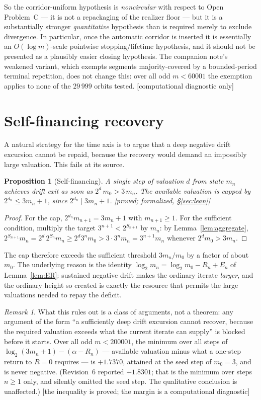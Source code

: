 \documentclass[11pt]{article}
\theoremstyle{plain}
\newtheorem{proposition}[theorem]{Proposition}
\theoremstyle{definition}
\theoremstyle{remark}
\newtheorem{remark}[theorem]{Remark}
\newcommand{\al}{\alpha}
\newcommand{\status}[1]{\textsf{\footnotesize[#1]}}
\begin{document}
So the corridor-uniform hypothesis is \emph{noncircular} with respect to Open Problem~C --- it is
not a repackaging of the realizer floor --- but it is a substantially stronger \emph{quantitative}
hypothesis than is required merely to exclude divergence. In particular, once the automatic
corridor is inserted it is essentially an $O(\log m)$-scale pointwise stopping/lifetime hypothesis,
and it should not be presented as a plausibly easier closing hypothesis. The
companion note's weakened variant, which exempts segments majority-covered by a bounded-period
terminal repetition, does not change this: over all odd $m<60001$ the exemption applies to none of
the $29\,999$ orbits tested. \status{computational diagnostic only}

\section{Self-financing recovery}\label{sec:selffin}

A natural strategy for the time axis is to argue that a deep negative drift excursion cannot be
repaid, because the recovery would demand an impossibly large valuation. This fails at its source.

\begin{proposition}[Self-financing]\label{prop:selffin}
A single step of valuation $d$ from state $m_n$ achieves drift exit as soon as
$2^{d}\,m_0>3\,m_n$. The available valuation is capped by $2^{d_n}\le 3m_n+1$, since
$2^{d_n}\mid 3m_n+1$. \status{proved; formalized, \S\ref{sec:lean}}
\end{proposition}

\begin{proof}
For the cap, $2^{d_n}m_{n+1}=3m_n+1$ with $m_{n+1}\ge1$. For the sufficient condition, multiply the
target $3^{n+1}<2^{S_{n+1}}$ by $m_n$: by Lemma~\ref{lem:aggregate},
$2^{S_{n+1}}m_n=2^{d}\,2^{S_n}m_n\ge 2^{d}3^nm_0>3\cdot3^nm_n=3^{n+1}m_n$ whenever
$2^dm_0>3m_n$.
\end{proof}

The cap therefore exceeds the sufficient threshold $3m_n/m_0$ by a factor of about $m_0$. The
underlying reason is the identity $\log_2 m_n=\log_2 m_0-R_n+E_n$ of Lemma~\ref{lem:ER}: sustained
negative drift makes the ordinary iterate \emph{larger}, and the ordinary height so created is
exactly the resource that permits the large valuations needed to repay the deficit.

\begin{remark}\label{rem:selffin}
What this rules out is a class of arguments, not a theorem: any argument of the form ``a
sufficiently deep drift excursion cannot recover, because the required valuation exceeds what the
current iterate can supply'' is blocked before it starts. Over all odd $m<200001$, the minimum over
all steps of $\log_2(3m_n+1)-(\al-R_n)$ --- available valuation minus what a one-step return to
$R=0$ requires --- is $+1.7370$, attained at the seed step of $m_0=3$, and is never negative.
(Revision~6 reported $+1.8301$; that is the minimum over steps $n\ge1$ only, and silently omitted
the seed step. The qualitative conclusion is unaffected.) \status{the inequality is proved; the margin is a
computational diagnostic}
\end{remark}
\end{document}
